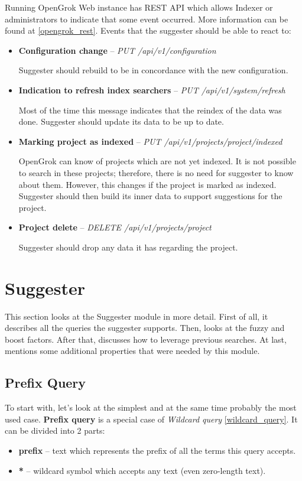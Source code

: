 Running OpenGrok Web instance has REST API which allows Indexer or administrators to indicate that some event occurred.
More information can be found at \ref{opengrok_rest}. Events that the suggester should be able to react to:
\begin{itemize}
    \item \textbf{Configuration change} – \textit{PUT /api/v1/configuration}

    Suggester should rebuild to be in concordance with the new configuration.
    \item \textbf{Indication to refresh index searchers} – \textit{PUT /api/v1/system/refresh}

    Most of the time this message indicates that the reindex of the data was done. Suggester
    should update its data to be up to date.

    \item \textbf{Marking project as indexed} – \textit{PUT /api/v1/projects/{project}/indexed}

    OpenGrok can know of projects which are not yet indexed. It is not possible to search in these projects;
    therefore, there is no need for suggester to know about them. However, this changes if the project is marked as indexed.
    Suggester should then build its inner data to support suggestions for the project.

    \item \textbf{Project delete} – \textit{DELETE /api/v1/projects/{project}}

    Suggester should drop any data it has regarding the project.
\end{itemize}

\section{Suggester}
\label{suggester_module}
This section looks at the Suggester module in more detail. First of all, it describes all the queries the suggester supports.
Then, looks at the fuzzy and boost factors. After that, discusses how to leverage previous searches. At last, mentions some
additional properties that were needed by this module.

\subsection{Prefix Query}
\label{prefix_query}
To start with, let's look at the simplest and at the same time probably the most used case. \textbf{Prefix query} is a special case of
\textit{Wildcard query} \ref{wildcard_query}. %
It can be divided into 2 parts:
\begin{itemize}
    \item \textbf{prefix} – text which represents the prefix of all the terms this query accepts.
    \item \textbf{*} – wildcard symbol which accepts any text (even zero-length text).
\end{itemize}

